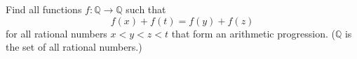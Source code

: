 Find all functions $f:\mathbb{Q}\rightarrow\mathbb{Q}$ such that\[f(x)+f(t)=f(y)+f(z)\]for all rational numbers $x<y<z<t$ that form an arithmetic progression.  ($\mathbb{Q}$ is the set of all rational numbers.)